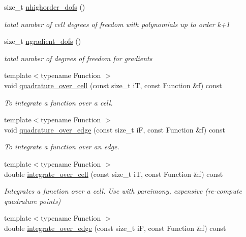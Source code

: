 \begin{DoxyCompactItemize}
size\+\_\+t \hyperlink{group__HybridCore2D_ga232407bbd91b79496d83efe17a645bc2}{nhighorder\+\_\+dofs} ()
\begin{DoxyCompactList}\small\item\em total number of cell degrees of freedom with polynomials up to order k+1 \end{DoxyCompactList}\item 
size\+\_\+t \hyperlink{group__HybridCore2D_ga6ee1992f745e350ce75b4bce6f17f9d6}{ngradient\+\_\+dofs} ()
\begin{DoxyCompactList}\small\item\em total number of degrees of freedom for gradients \end{DoxyCompactList}\item 
{\footnotesize template$<$typename Function $>$ }\\void \hyperlink{group__HybridCore2D_ga22e6b459aaa9b917aeac83fe6b1a019d}{quadrature\+\_\+over\+\_\+cell} (const size\+\_\+t iT, const Function \&f) const
\begin{DoxyCompactList}\small\item\em To integrate a function over a cell. \end{DoxyCompactList}\item 
{\footnotesize template$<$typename Function $>$ }\\void \hyperlink{group__HybridCore2D_ga6fd7907d1937b3e4401e6e1d056a56c5}{quadrature\+\_\+over\+\_\+edge} (const size\+\_\+t iF, const Function \&f) const
\begin{DoxyCompactList}\small\item\em To integrate a function over an edge. \end{DoxyCompactList}\item 
{\footnotesize template$<$typename Function $>$ }\\double \hyperlink{group__HybridCore2D_gadb2109a6dd462ca0230e820f4c21d32a}{integrate\+\_\+over\+\_\+cell} (const size\+\_\+t iT, const Function \&f) const
\begin{DoxyCompactList}\small\item\em Integrates a function over a cell. Use with parcimony, expensive (re-\/compute quadrature points) \end{DoxyCompactList}\item 
{\footnotesize template$<$typename Function $>$ }\\double \hyperlink{group__HybridCore2D_ga38d686177fc4db2ad3f60bf21eb963d8}{integrate\+\_\+over\+\_\+edge} (const size\+\_\+t iF, const Function \&f) const

\end{DoxyCompactItemize}
